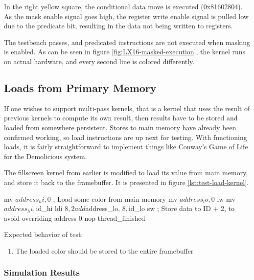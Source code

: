 \documentclass[../main/report.tex]{subfiles}
\begin{document}
In the right yellow square, the conditional data move is executed (0x81602804).
As the mask enable signal goes high, the register write enable signal is pulled low due to the predicate bit, resulting in the data not being written to registers.

The testbench passes, and predicated instructions are not executed when masking is enabled.
As can be seen in figure \ref{fig:LX16-masked-execution}, the kernel runs on actual hardware, and every second line is colored differently.


\subsection{Loads from Primary Memory}

If one wishes to support multi-pass kernels, that is a kernel that uses the result of previous kernels to compute its own result, then results have to be stored and loaded from somewhere persistent.
Stores to main memory have already been confirmed working, so load instructions are up next for testing.
With functioning loads, it is fairly straightforward to implement things like Conway's Game of Life  \cite{game-of-life} for the Demolicious system.

The fillscreen kernel from earlier is modified to load its value from main memory, and store it back to the framebuffer.
It is presented in figure \ref{lst:test-load-kernel}.

\begin{assembly}[caption={Kernel to test loads from main memory}, label=lst:test-load-kernel]
mv $address_hi, $0         ; Load some color from main memory
mv $address_lo, $0
lw
mv $address_hi, $id_hi
ldi $8, 2
add $address_lo, $8, $id_lo
sw                         ; Store data to ID + 2, to avoid overriding address 0
nop
thread_finished
\end{assembly}

Expected behavior of test:
\begin{enumerate}
  \item
    The loaded color should be stored to the entire framebuffer
\end{enumerate}

\subsubsection*{Simulation Results}
\end{document}
